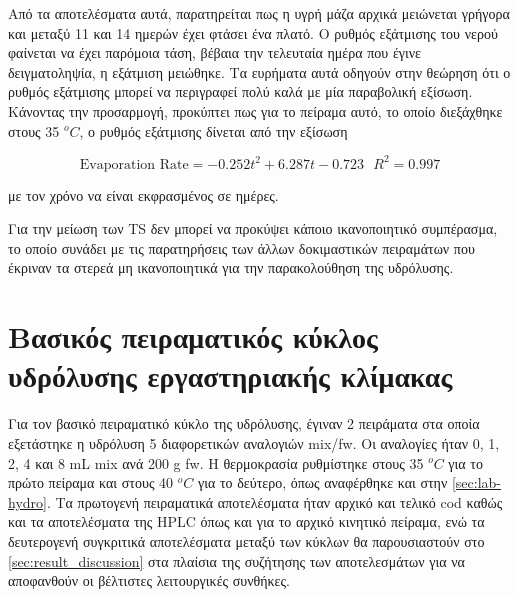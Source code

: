 \documentclass[11pt]{report}
\begin{document}
\begin{enumerate}
Από τα αποτελέσματα αυτά, παρατηρείται πως η υγρή μάζα αρχικά μειώνεται γρήγορα και μεταξύ 11 και 14 ημερών έχει φτάσει ένα πλατό. Ο ρυθμός εξάτμισης του νερού φαίνεται να έχει παρόμοια τάση, βέβαια την τελευταία ημέρα που έγινε δειγματοληψία, η εξάτμιση μειώθηκε. Τα ευρήματα αυτά οδηγούν στην θεώρηση ότι ο ρυθμός εξάτμισης μπορεί να περιγραφεί πολύ καλά με μία παραβολική εξίσωση. Κάνοντας την προσαρμογή, προκύπτει πως για το πείραμα αυτό, το οποίο διεξάχθηκε στους 35 \(^oC\), ο ρυθμός εξάτμισης δίνεται από την εξίσωση

\[ \text{Evaporation Rate} = -0.252t^2 + 6.287t - 0.723 ~ ~ ~ R^2 = 0.997 \]

με τον χρόνο να είναι εκφρασμένος σε ημέρες.

Για την μείωση των TS δεν μπορεί να προκύψει κάποιο ικανοποιητικό συμπέρασμα, το οποίο συνάδει με τις παρατηρήσεις των άλλων δοκιμαστικών πειραμάτων που έκριναν τα στερεά μη ικανοποιητικά για την παρακολούθηση της υδρόλυσης.
\end{enumerate}

\section{Βασικός πειραματικός κύκλος υδρόλυσης εργαστηριακής κλίμακας}
\label{sec:org561c9d2}
Για τον βασικό πειραματικό κύκλο της υδρόλυσης, έγιναν 2 πειράματα στα οποία εξετάστηκε η υδρόλυση 5 διαφορετικών αναλογιών \acrshort{mix}/\acrshort{fw}. Οι αναλογίες ήταν 0, 1, 2, 4 και 8 mL \acrshort{mix} ανά 200 g \acrshort{fw}. Η θερμοκρασία ρυθμίστηκε στους 35 \(^oC\) για το πρώτο πείραμα και στους 40 \(^oC\) για το δεύτερο, όπως αναφέρθηκε και στην \autoref{sec:lab-hydro}. Τα πρωτογενή πειραματικά αποτελέσματα ήταν αρχικό και τελικό \acrshort{cod} καθώς και τα αποτελέσματα της HPLC όπως και για το αρχικό κινητικό πείραμα, ενώ τα δευτερογενή συγκριτικά αποτελέσματα μεταξύ των κύκλων θα παρουσιαστούν στο \autoref{sec:result_discussion} στα πλαίσια της συζήτησης των αποτελεσμάτων για να αποφανθούν οι βέλτιστες λειτουργικές συνθήκες.
\end{document}
